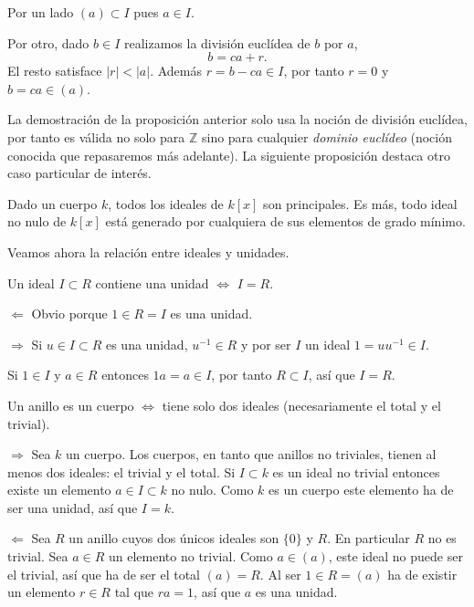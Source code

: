 Por un lado \((a)\subset I\) pues \(a\in I\).

Por otro, dado \(b\in I\) realizamos la división euclídea de \(b\) por
\(a\), \[b=ca+r.\] El resto satisface \(|r|<|a|\). Además
\(r=b-ca\in I\), por tanto \(r=0\) y \(b=ca\in (a)\).\\

La demostración de la proposición anterior solo usa la noción de
división euclídea, por tanto es válida no solo para \(\mathbb Z\) sino
para cualquier \emph{dominio euclídeo} (noción conocida que repasaremos
más adelante). La siguiente proposición destaca otro caso particular de
interés.


Dado un cuerpo \(k\), todos los ideales de \(k[x]\) son principales. Es
más, todo ideal no nulo de \(k[x]\) está generado por cualquiera de sus
elementos de grado mínimo. 

Veamos ahora la relación entre ideales y unidades.


Un ideal \(I\subset R\) contiene una unidad \(\Leftrightarrow\) \(I=R\).


\(\Leftarrow\) Obvio porque \(1\in R=I\) es una unidad.

\(\Rightarrow\) Si \(u\in I\subset R\) es una unidad, \(u^{-1}\in R\) y
por ser \(I\) un ideal \(1=uu^{-1}\in I.\)

Si \(1\in I\) y \(a\in R\) entonces \(1a=a\in I\), por tanto
\(R\subset I\), así que \(I=R\).\\


Un anillo es un cuerpo \(\Leftrightarrow\) tiene solo dos ideales
(necesariamente el total y el trivial). 


\(\Rightarrow\) Sea \(k\) un cuerpo. Los cuerpos, en tanto que anillos
no triviales, tienen al menos dos ideales: el trivial y el total. Si
\(I\subset k\) es un ideal no trivial entonces existe un elemento
\(a\in I\subset k\) no nulo. Como \(k\) es un cuerpo este elemento ha de
ser una unidad, así que \(I=k\).

\(\Leftarrow\) Sea \(R\) un anillo cuyos dos únicos ideales son
\(\{0\}\) y \(R\). En particular \(R\) no es trivial. Sea \(a\in R\)
un elemento no trivial. Como \(a\in (a)\), este ideal no puede ser el
trivial, así que ha de ser el total \((a)=R\). Al ser \(1\in R=(a)\) ha
de existir un elemento \(r\in R\) tal que \(ra=1\), así que \(a\) es una
unidad.\\

